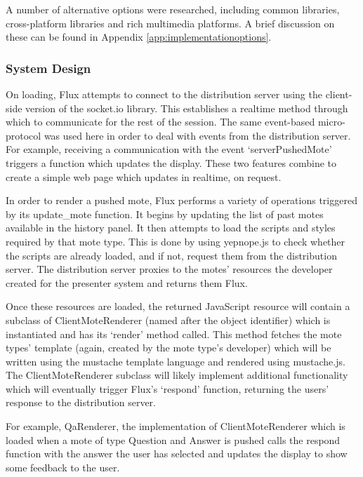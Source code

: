 \documentclass[a4papert,11pt,notitlepage]{ltxdoc}
\begin{document}
A number of alternative options were researched, including common libraries, cross-platform libraries and rich multimedia platforms. A brief discussion on these can be found in Appendix \ref{app:implementationoptions}.

\subsubsection{System Design}
On loading, Flux attempts to connect to the distribution server using the client-side version of the socket.io library. This establishes a realtime method through which to communicate for the rest of the session. The same event-based micro-protocol was used here in order to deal with events from the distribution server. For example, receiving a communication with the event `serverPushedMote' triggers a function which updates the display. These two features combine to create a simple web page which updates in realtime, on request.

In order to render a pushed mote, Flux performs a variety of operations triggered by its update\_mote function. It begins by updating the list of past motes available in the history panel. It then attempts to load the scripts and styles required by that mote type. This is done by using yepnope.js\cite{yepnope:web} to check whether the scripts are already loaded, and if not, request them from the distribution server. The distribution server proxies to the motes' resources the developer created for the presenter system and returns them Flux.

Once these resources are loaded, the returned JavaScript resource will contain a subclass of ClientMoteRenderer (named after the object identifier) which is instantiated and has its `render' method called. This method fetches the mote types' template (again, created by the mote type's developer) which will be written using the mustache\cite{mustache:web} template language and rendered using mustache.js\cite{mustachejs:web}. The ClientMoteRenderer subclass will likely implement additional functionality which will eventually trigger Flux's `respond' function, returning the users' response to the distribution server.

For example, QaRenderer, the implementation of ClientMoteRenderer which is loaded when a mote of type Question and Answer is pushed calls the respond function with the answer the user has selected and updates the display to show some feedback to the user.

\end{document}
